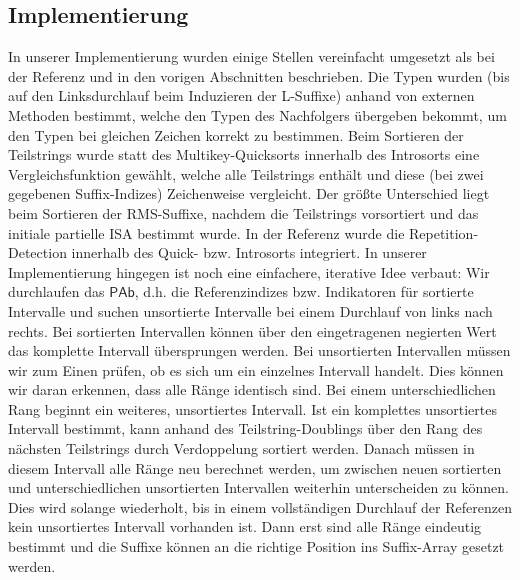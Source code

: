 \subsection{Implementierung}

In unserer Implementierung wurden einige Stellen vereinfacht umgesetzt als bei der Referenz und in den vorigen Abschnitten beschrieben. Die Typen wurden (bis auf den Linksdurchlauf beim Induzieren der L-Suffixe) anhand von externen Methoden bestimmt, welche den Typen des Nachfolgers übergeben bekommt, um den Typen bei gleichen Zeichen korrekt zu bestimmen. Beim Sortieren der Teilstrings wurde statt des Multikey-Quicksorts innerhalb des Introsorts eine Vergleichsfunktion gewählt, welche alle Teilstrings enthält und diese (bei zwei gegebenen Suffix-Indizes) Zeichenweise vergleicht. 
Der größte Unterschied liegt beim Sortieren der RMS-Suffixe, nachdem die Teilstrings vorsortiert und das initiale partielle ISA bestimmt wurde. In der Referenz wurde die Repetition-Detection innerhalb des Quick- bzw. Introsorts integriert. In unserer Implementierung hingegen ist noch eine einfachere, iterative Idee verbaut: Wir durchlaufen das $\mathsf{PAb}$, d.h. die Referenzindizes bzw. Indikatoren für sortierte Intervalle und suchen unsortierte Intervalle bei einem Durchlauf von links nach rechts. Bei sortierten Intervallen können über den eingetragenen negierten Wert das komplette Intervall übersprungen werden. Bei unsortierten Intervallen müssen wir zum Einen prüfen, ob es sich um ein einzelnes Intervall handelt. Dies können wir daran erkennen, dass alle Ränge identisch sind. Bei einem unterschiedlichen Rang beginnt ein weiteres, unsortiertes Intervall. Ist ein komplettes unsortiertes Intervall bestimmt, kann anhand des Teilstring-Doublings über den Rang des nächsten Teilstrings durch Verdoppelung sortiert werden. Danach müssen in diesem Intervall alle Ränge neu berechnet werden, um zwischen neuen sortierten und unterschiedlichen unsortierten Intervallen weiterhin unterscheiden zu können. Dies wird solange wiederholt, bis in einem vollständigen Durchlauf der Referenzen kein unsortiertes Intervall vorhanden ist. Dann erst sind alle Ränge eindeutig bestimmt und die Suffixe können an die richtige Position ins Suffix-Array gesetzt werden.